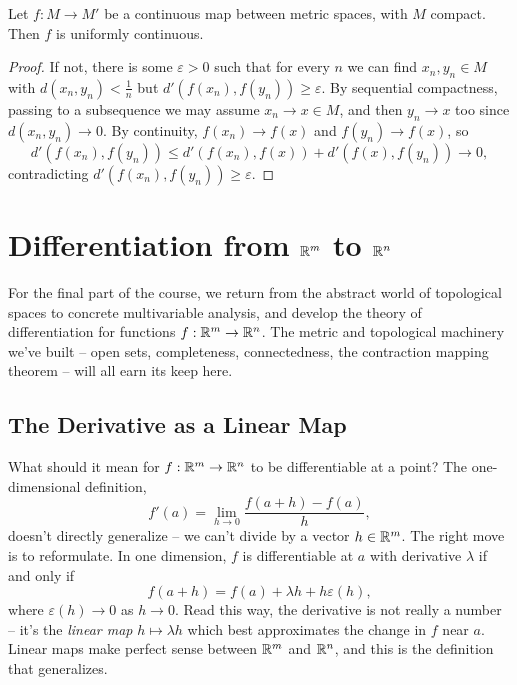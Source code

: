 \documentclass[a4paper]{scrartcl}
\begin{document}
\begin{theorem}
    Let $f: M \rightarrow M'$ be a continuous map between metric spaces, with $M$ compact. Then $f$ is uniformly continuous.
\end{theorem}
\begin{proof}
    If not, there is some $\varepsilon > 0$ such that for every $n$ we can find $x_n, y_n \in M$ with $d(x_n, y_n) < \frac{1}{n}$ but $d'(f(x_n), f(y_n)) \geq \varepsilon$. By sequential compactness, passing to a subsequence we may assume $x_n \rightarrow x \in M$, and then $y_n \rightarrow x$ too since $d(x_n, y_n) \rightarrow 0$. By continuity, $f(x_n) \rightarrow f(x)$ and $f(y_n) \rightarrow f(x)$, so
    $$
    d'(f(x_n), f(y_n)) \leq d'(f(x_n), f(x)) + d'(f(x), f(y_n)) \rightarrow 0,
    $$
    contradicting $d'(f(x_n), f(y_n)) \geq \varepsilon$.
\end{proof}

\section{Differentiation from $\mathbb{R}^m$ to $\mathbb{R}^n$}

For the final part of the course, we return from the abstract world of topological spaces to concrete multivariable analysis, and develop the theory of differentiation for functions $f: \mathbb{R}^m \rightarrow \mathbb{R}^n$. The metric and topological machinery we've built -- open sets, completeness, connectedness, the contraction mapping theorem -- will all earn its keep here.

\subsection{The Derivative as a Linear Map}

What should it mean for $f: \mathbb{R}^m \rightarrow \mathbb{R}^n$ to be differentiable at a point? The one-dimensional definition,
$$
f'(a) = \lim_{h \to 0} \frac{f(a + h) - f(a)}{h},
$$
doesn't directly generalize -- we can't divide by a vector $h \in \mathbb{R}^m$. The right move is to reformulate. In one dimension, $f$ is differentiable at $a$ with derivative $\lambda$ if and only if
$$
f(a + h) = f(a) + \lambda h + h\varepsilon(h),
$$
where $\varepsilon(h) \rightarrow 0$ as $h \rightarrow 0$. Read this way, the derivative is not really a number -- it's the \emph{linear map} $h \mapsto \lambda h$ which best approximates the change in $f$ near $a$. Linear maps make perfect sense between $\mathbb{R}^m$ and $\mathbb{R}^n$, and this is the definition that generalizes.
\end{document}
